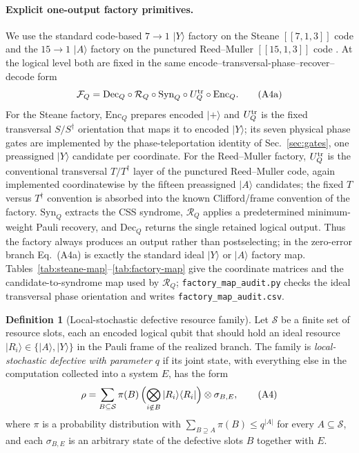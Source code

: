 \documentclass[aps,prx,reprint,superscriptaddress,nofootinbib,floatfix,longbibliography]{revtex4-2}
\theoremstyle{definition}
\newtheorem{definition}[theorem]{Definition}
\begin{document}
\paragraph{Explicit one-output factory primitives.}
We use the standard code-based $7\!\to\!1$ $|Y\rangle$ factory on the Steane
$[[7,1,3]]$ code and the $15\!\to\!1$ $|A\rangle$ factory on the punctured
Reed--Muller $[[15,1,3]]$ code \cite{Reichardt,BravyiKitaev,LitinskiMSD}.
At the logical level both are fixed in the same encode--transversal-phase--recover--decode form
\begin{equation}
 \mathcal F_Q=\mathrm{Dec}_Q\circ\mathcal R_Q\circ\mathrm{Syn}_Q
 \circ U_Q^{\rm tr}\circ\mathrm{Enc}_Q .                         \tag{A4a}
\end{equation}
For the Steane factory, $\mathrm{Enc}_Q$ prepares encoded $|+\rangle$ and
$U_Q^{\rm tr}$ is the fixed transversal $S/S^\dagger$ orientation that maps it to encoded
$|Y\rangle$; its seven physical phase gates are implemented by the
phase-teleportation identity of Sec.~\ref{sec:gates}, one preassigned
$|Y\rangle$ candidate per coordinate.  For the Reed--Muller factory,
$U_Q^{\rm tr}$ is the conventional transversal $T/T^\dagger$ layer of the
punctured Reed--Muller code, again implemented coordinatewise by the fifteen
preassigned $|A\rangle$ candidates; the fixed $T$ versus $T^\dagger$ convention
is absorbed into the known Clifford/frame convention of the factory.
$\mathrm{Syn}_Q$ extracts the CSS syndrome, $\mathcal R_Q$ applies a predetermined
minimum-weight Pauli recovery, and $\mathrm{Dec}_Q$ returns the single retained
logical output.  Thus the factory always produces an output rather than
postselecting; in the zero-error branch Eq.~(A4a) is exactly the standard ideal
$|Y\rangle$ or $|A\rangle$ factory map.  Tables~\ref{tab:steane-map}--\ref{tab:factory-map} give the coordinate matrices and the candidate-to-syndrome map used by $\mathcal R_Q$; \texttt{factory\_map\_audit.py} checks the ideal transversal phase orientation and writes \texttt{factory\_map\_audit.csv}.

\begin{definition}[Local-stochastic defective resource family]
\label{def:defective-family}
Let $\mathcal S$ be a finite set of resource slots, each an encoded logical
qubit that should hold an ideal resource $|R_i\rangle\in\{|A\rangle,|Y\rangle\}$
in the Pauli frame of the realized branch.  The family is
\emph{local-stochastic defective with parameter $q$} if its joint state, with
everything else in the computation collected into a system $E$, has the form
\begin{equation}
 \rho=\sum_{B\subseteq\mathcal S}\pi(B)\,
 \Bigl(\bigotimes_{i\notin B}|R_i\rangle\langle R_i|\Bigr)\otimes\sigma_{B,E},
 \tag{A4}
\end{equation}
where $\pi$ is a probability distribution with
$\sum_{B\supseteq A}\pi(B)\le q^{|A|}$ for every $A\subseteq\mathcal S$, and
each $\sigma_{B,E}$ is an arbitrary state of the defective slots $B$ together
with $E$.
\end{definition}
\end{document}
